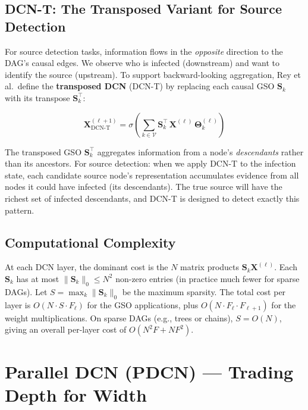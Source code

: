 \subsection{DCN-T: The Transposed Variant for Source Detection}

For source detection tasks, information flows in the \emph{opposite} direction
to the DAG's causal edges. We observe who is infected (downstream) and want to
identify the source (upstream). To support backward-looking aggregation, Rey et
al.\ define the \textbf{transposed DCN} (DCN-T) by replacing each causal GSO
$\mathbf{S}_k$ with its transpose $\mathbf{S}_k^\top$:

\begin{equation}
    \mathbf{X}^{(\ell+1)}_{\text{DCN-T}} = \sigma\!\left(
        \sum_{k \in \mathcal{V}} \mathbf{S}_k^\top \, \mathbf{X}^{(\ell)} \,
        \boldsymbol{\Theta}_k^{(\ell)}
    \right)
    \label{eq:dcnt_layer}
\end{equation}

The transposed GSO $\mathbf{S}_k^\top$ aggregates information from a node's
\emph{descendants} rather than its ancestors. For source detection: when we
apply DCN-T to the infection state, each candidate source node's representation
accumulates evidence from all nodes it could have infected (its descendants).
The true source will have the richest set of infected descendants, and DCN-T
is designed to detect exactly this pattern.

\subsection{Computational Complexity}

At each DCN layer, the dominant cost is the $N$ matrix products
$\mathbf{S}_k \mathbf{X}^{(\ell)}$. Each $\mathbf{S}_k$ has at most
$\|\mathbf{S}_k\|_0 \le N^2$ non-zero entries (in practice much fewer for
sparse DAGs). Let $S = \max_k \|\mathbf{S}_k\|_0$ be the maximum sparsity.
The total cost per layer is $O(N \cdot S \cdot F_\ell)$ for the GSO
applications, plus $O(N \cdot F_\ell \cdot F_{\ell+1})$ for the weight
multiplications. On sparse DAGs (e.g., trees or chains), $S = O(N)$, giving
an overall per-layer cost of $O(N^2 F + NF^2)$.

\section{Parallel DCN (PDCN) --- Trading Depth for Width}
\label{sec:dagcn_pdcn}

